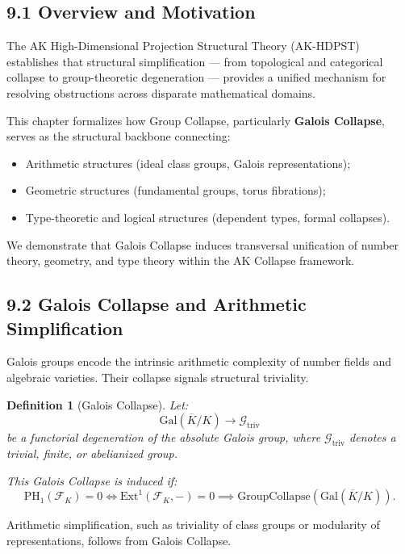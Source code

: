 \documentclass[11pt]{article}
\newtheorem{definition}[theorem]{Definition}
\begin{document}
\subsection*{9.1 Overview and Motivation}

The AK High-Dimensional Projection Structural Theory (AK-HDPST) establishes that structural simplification — from topological and categorical collapse to group-theoretic degeneration — provides a unified mechanism for resolving obstructions across disparate mathematical domains.

This chapter formalizes how Group Collapse, particularly \textbf{Galois Collapse}, serves as the structural backbone connecting:

\begin{itemize}
    \item Arithmetic structures (ideal class groups, Galois representations);
    \item Geometric structures (fundamental groups, torus fibrations);
    \item Type-theoretic and logical structures (dependent types, formal collapses).
\end{itemize}

We demonstrate that Galois Collapse induces transversal unification of number theory, geometry, and type theory within the AK Collapse framework.

\subsection*{9.2 Galois Collapse and Arithmetic Simplification}

Galois groups encode the intrinsic arithmetic complexity of number fields and algebraic varieties. Their collapse signals structural triviality.

\begin{definition}[Galois Collapse]
Let:
\[
\mathrm{Gal}(\overline{K}/K) \longrightarrow \mathcal{G}_{\mathrm{triv}}
\]
be a functorial degeneration of the absolute Galois group, where \( \mathcal{G}_{\mathrm{triv}} \) denotes a trivial, finite, or abelianized group.

This Galois Collapse is induced if:
\[
\mathrm{PH}_1(\mathcal{F}_K) = 0 \iff \mathrm{Ext}^1(\mathcal{F}_K, -) = 0 \implies \mathrm{GroupCollapse}(\mathrm{Gal}(\overline{K}/K)).
\]
\end{definition}

Arithmetic simplification, such as triviality of class groups or modularity of representations, follows from Galois Collapse.
\end{document}

